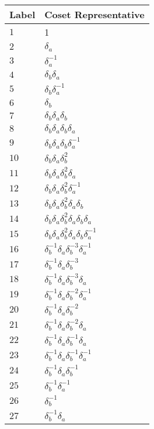 \documentclass{article}
\begin{document}

\begin{center}
\begin{tabular}{ll}
\toprule
Label & Coset Representative\\
\midrule
$1$ & 1 \\
$2$ & $\delta_a^{}$ \\
$3$ & $\delta_a^{-1}$ \\
$4$ & $\delta_b^{}\delta_a^{}$ \\
$5$ & $\delta_b^{}\delta_a^{-1}$ \\
$6$ & $\delta_b^{}$ \\
$7$ & $\delta_b^{}\delta_a^{}\delta_b^{}$ \\
$8$ & $\delta_b^{}\delta_a^{}\delta_b^{}\delta_a^{}$ \\
$9$ & $\delta_b^{}\delta_a^{}\delta_b^{}\delta_a^{-1}$ \\
$10$ & $\delta_b^{}\delta_a^{}\delta_b^{2}$ \\
$11$ & $\delta_b^{}\delta_a^{}\delta_b^{2}\delta_a^{}$ \\
$12$ & $\delta_b^{}\delta_a^{}\delta_b^{2}\delta_a^{-1}$ \\
$13$ & $\delta_b^{}\delta_a^{}\delta_b^{2}\delta_a^{}\delta_b^{}$ \\
$14$ & $\delta_b^{}\delta_a^{}\delta_b^{2}\delta_a^{}\delta_b^{}\delta_a^{}$ \\
$15$ & $\delta_b^{}\delta_a^{}\delta_b^{2}\delta_a^{}\delta_b^{}\delta_a^{-1}$ 
\\
$16$ & $\delta_b^{-1}\delta_a^{}\delta_b^{-3}\delta_a^{-1}$ \\
$17$ & $\delta_b^{-1}\delta_a^{}\delta_b^{-3}$ \\
$18$ & $\delta_b^{-1}\delta_a^{}\delta_b^{-3}\delta_a^{}$ \\
$19$ & $\delta_b^{-1}\delta_a^{}\delta_b^{-2}\delta_a^{-1}$ \\
$20$ & $\delta_b^{-1}\delta_a^{}\delta_b^{-2}$ \\
$21$ & $\delta_b^{-1}\delta_a^{}\delta_b^{-2}\delta_a^{}$ \\
$22$ & $\delta_b^{-1}\delta_a^{}\delta_b^{-1}\delta_a^{}$ \\
$23$ & $\delta_b^{-1}\delta_a^{}\delta_b^{-1}\delta_a^{-1}$ \\
$24$ & $\delta_b^{-1}\delta_a^{}\delta_b^{-1}$ \\
$25$ & $\delta_b^{-1}\delta_a^{-1}$ \\
$26$ & $\delta_b^{-1}$ \\
$27$ & $\delta_b^{-1}\delta_a^{}$ \\

\end{tabular}
\end{center}
\end{document}
